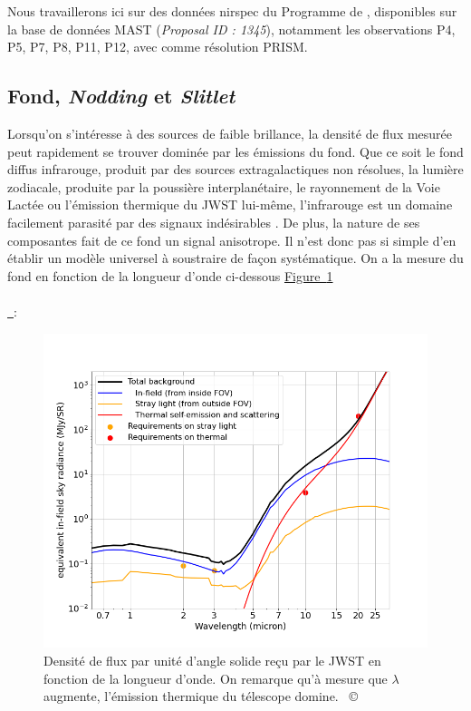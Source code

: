 \documentclass[12pt, a4paper]{article}
\newcommand{\customcite}[1]{\mbox{
  {\small \copyright} \cite{#1}}
}
\newcommand*{\figref}[2][]{%
  \hyperref[{#2}]{%
    Figure~\ref*{#2}%
    \ifx\\#1\\%
    \else
      \,#1%
    \fi
  }%
}
\begin{document}
Nous travaillerons ici sur des données \gls{nirspec} du Programme de \textit{}, disponibles sur la base de données MAST  (\textit{Proposal ID : 1345}), notamment les observations P4, P5, P7, P8, P11, P12, avec comme résolution PRISM.

\subsection{Fond, \textit{Nodding} et \textit{Slitlet}}

Lorsqu'on s'intéresse à des sources de faible brillance, la densité de flux mesurée peut rapidement se trouver dominée par les émissions du fond. Que ce soit le fond diffus infrarouge, produit par des sources extragalactiques non résolues, la lumière zodiacale, produite par la poussière interplanétaire, le rayonnement de la Voie Lactée ou l'émission thermique du JWST lui-même, l'infrarouge est un domaine facilement parasité par des signaux indésirables . De plus, la nature de ses composantes fait de ce fond un signal anisotrope. Il n'est donc pas si simple d'en établir un modèle universel à soustraire de façon systématique. On a la mesure du fond en fonction de la longueur d'onde ci-dessous \figref{fig:background_jwst} : 

\begin{figure}[!h]
  \centering
  \includegraphics[scale=0.55]{assets/background_jwst.png}
  \caption{Densité de flux par unité d'angle solide reçu par le JWST en fonction de la longueur d'onde. On remarque qu'à mesure que $\lambda$ augmente, l'émission thermique du télescope domine. \customcite{jwst_background}}
  \label{fig:background_jwst}
\end{figure}
\end{document}
